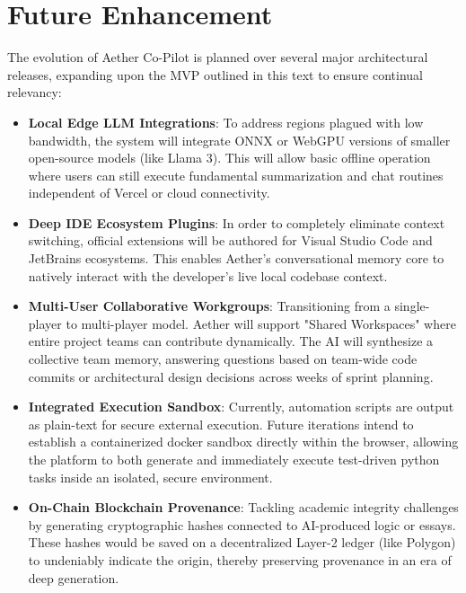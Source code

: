 \section{Future Enhancement}
The evolution of Aether Co-Pilot is planned over several major architectural releases, expanding upon the MVP outlined in this text to ensure continual relevancy:
\begin{itemize}
    \item \textbf{Local Edge LLM Integrations}: To address regions plagued with low bandwidth, the system will integrate ONNX or WebGPU versions of smaller open-source models (like Llama 3). This will allow basic offline operation where users can still execute fundamental summarization and chat routines independent of Vercel or cloud connectivity.
    \item \textbf{Deep IDE Ecosystem Plugins}: In order to completely eliminate context switching, official extensions will be authored for Visual Studio Code and JetBrains ecosystems. This enables Aether's conversational memory core to natively interact with the developer's live local codebase context.
    \item \textbf{Multi-User Collaborative Workgroups}: Transitioning from a single-player to multi-player model. Aether will support "Shared Workspaces" where entire project teams can contribute dynamically. The AI will synthesize a collective team memory, answering questions based on team-wide code commits or architectural design decisions across weeks of sprint planning.
    \item \textbf{Integrated Execution Sandbox}: Currently, automation scripts are output as plain-text for secure external execution. Future iterations intend to establish a containerized docker sandbox directly within the browser, allowing the platform to both generate and immediately execute test-driven python tasks inside an isolated, secure environment.
    \item \textbf{On-Chain Blockchain Provenance}: Tackling academic integrity challenges by generating cryptographic hashes connected to AI-produced logic or essays. These hashes would be saved on a decentralized Layer-2 ledger (like Polygon) to undeniably indicate the origin, thereby preserving provenance in an era of deep generation.
\end{itemize}

\newpage

